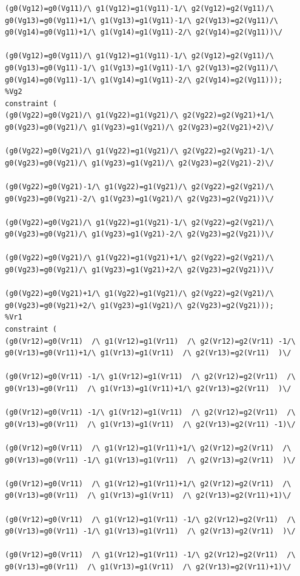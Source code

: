 \begin{appendices}
\begin{lstlisting}
(g0(Vg12)=g0(Vg11)/\ g1(Vg12)=g1(Vg11)-1/\ g2(Vg12)=g2(Vg11)/\ g0(Vg13)=g0(Vg11)+1/\ g1(Vg13)=g1(Vg11)-1/\ g2(Vg13)=g2(Vg11)/\ g0(Vg14)=g0(Vg11)+1/\ g1(Vg14)=g1(Vg11)-2/\ g2(Vg14)=g2(Vg11))\/ 

(g0(Vg12)=g0(Vg11)/\ g1(Vg12)=g1(Vg11)-1/\ g2(Vg12)=g2(Vg11)/\ g0(Vg13)=g0(Vg11)-1/\ g1(Vg13)=g1(Vg11)-1/\ g2(Vg13)=g2(Vg11)/\ g0(Vg14)=g0(Vg11)-1/\ g1(Vg14)=g1(Vg11)-2/\ g2(Vg14)=g2(Vg11)));
%Vg2
constraint (
(g0(Vg22)=g0(Vg21)/\ g1(Vg22)=g1(Vg21)/\ g2(Vg22)=g2(Vg21)+1/\ g0(Vg23)=g0(Vg21)/\ g1(Vg23)=g1(Vg21)/\ g2(Vg23)=g2(Vg21)+2)\/ 

(g0(Vg22)=g0(Vg21)/\ g1(Vg22)=g1(Vg21)/\ g2(Vg22)=g2(Vg21)-1/\ g0(Vg23)=g0(Vg21)/\ g1(Vg23)=g1(Vg21)/\ g2(Vg23)=g2(Vg21)-2)\/ 

(g0(Vg22)=g0(Vg21)-1/\ g1(Vg22)=g1(Vg21)/\ g2(Vg22)=g2(Vg21)/\ g0(Vg23)=g0(Vg21)-2/\ g1(Vg23)=g1(Vg21)/\ g2(Vg23)=g2(Vg21))\/ 

(g0(Vg22)=g0(Vg21)/\ g1(Vg22)=g1(Vg21)-1/\ g2(Vg22)=g2(Vg21)/\ g0(Vg23)=g0(Vg21)/\ g1(Vg23)=g1(Vg21)-2/\ g2(Vg23)=g2(Vg21))\/ 

(g0(Vg22)=g0(Vg21)/\ g1(Vg22)=g1(Vg21)+1/\ g2(Vg22)=g2(Vg21)/\ g0(Vg23)=g0(Vg21)/\ g1(Vg23)=g1(Vg21)+2/\ g2(Vg23)=g2(Vg21))\/ 

(g0(Vg22)=g0(Vg21)+1/\ g1(Vg22)=g1(Vg21)/\ g2(Vg22)=g2(Vg21)/\ g0(Vg23)=g0(Vg21)+2/\ g1(Vg23)=g1(Vg21)/\ g2(Vg23)=g2(Vg21)));
%Vr1
constraint (
(g0(Vr12)=g0(Vr11)  /\ g1(Vr12)=g1(Vr11)  /\ g2(Vr12)=g2(Vr11) -1/\ g0(Vr13)=g0(Vr11)+1/\ g1(Vr13)=g1(Vr11)  /\ g2(Vr13)=g2(Vr11)  )\/ 

(g0(Vr12)=g0(Vr11) -1/\ g1(Vr12)=g1(Vr11)  /\ g2(Vr12)=g2(Vr11)  /\ g0(Vr13)=g0(Vr11)  /\ g1(Vr13)=g1(Vr11)+1/\ g2(Vr13)=g2(Vr11)  )\/ 

(g0(Vr12)=g0(Vr11) -1/\ g1(Vr12)=g1(Vr11)  /\ g2(Vr12)=g2(Vr11)  /\ g0(Vr13)=g0(Vr11)  /\ g1(Vr13)=g1(Vr11)  /\ g2(Vr13)=g2(Vr11) -1)\/ 

(g0(Vr12)=g0(Vr11)  /\ g1(Vr12)=g1(Vr11)+1/\ g2(Vr12)=g2(Vr11)  /\ g0(Vr13)=g0(Vr11) -1/\ g1(Vr13)=g1(Vr11)  /\ g2(Vr13)=g2(Vr11)  )\/ 

(g0(Vr12)=g0(Vr11)  /\ g1(Vr12)=g1(Vr11)+1/\ g2(Vr12)=g2(Vr11)  /\ g0(Vr13)=g0(Vr11)  /\ g1(Vr13)=g1(Vr11)  /\ g2(Vr13)=g2(Vr11)+1)\/ 

(g0(Vr12)=g0(Vr11)  /\ g1(Vr12)=g1(Vr11) -1/\ g2(Vr12)=g2(Vr11)  /\ g0(Vr13)=g0(Vr11) -1/\ g1(Vr13)=g1(Vr11)  /\ g2(Vr13)=g2(Vr11)  )\/ 

(g0(Vr12)=g0(Vr11)  /\ g1(Vr12)=g1(Vr11) -1/\ g2(Vr12)=g2(Vr11)  /\ g0(Vr13)=g0(Vr11)  /\ g1(Vr13)=g1(Vr11)  /\ g2(Vr13)=g2(Vr11)+1)\/ 


\end{lstlisting}
\end{appendices}
